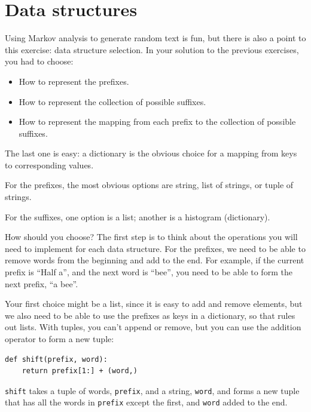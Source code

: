 \documentclass[10pt]{book}
\begin{document}
\section{Data structures}

Using Markov analysis to generate random text is fun, but there is
also a point to this exercise: data structure selection.  In your
solution to the previous exercises, you had to choose:

\begin{itemize}

\item How to represent the prefixes.

\item How to represent the collection of possible suffixes.

\item How to represent the mapping from each prefix to
the collection of possible suffixes.

\end{itemize}

The last one is easy: a dictionary is the obvious choice
for a mapping from keys to corresponding values.

For the prefixes, the most obvious options are string,
list of strings, or tuple of strings.

For the suffixes,
one option is a list; another is a histogram (dictionary).

How should you choose?  The first step is to think about
the operations you will need to implement for each data structure.
For the prefixes, we need to be able to remove words from
the beginning and add to the end.  For example, if the current
prefix is ``Half a'', and the next word is ``bee'', you need
to be able to form the next prefix, ``a bee''.

Your first choice might be a list, since it is easy to add
and remove elements, but we also need to be able to use the
prefixes as keys in a dictionary, so that rules out lists.
With tuples, you can't append or remove, but you can use
the addition operator to form a new tuple:

\begin{verbatim}
def shift(prefix, word):
    return prefix[1:] + (word,)
\end{verbatim}
%
{\tt shift} takes a tuple of words, {\tt prefix}, and a string,
{\tt word}, and forms a new tuple that has all the words
in {\tt prefix} except the first, and {\tt word} added to
the end.
\end{document}
